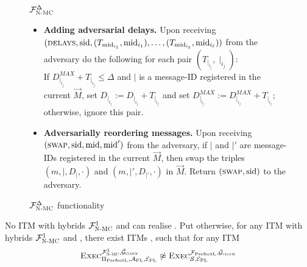 \begin{figure}
\begin{systembox}{$\mathcal{F}_{\textsc{N-MC}}^{\Delta}$}
{\begin{itemize}
\begin{enumerate}
			\end{enumerate}
			
			\smallskip
			\item \textbf{Adding adversarial delays.}
			Upon receiving $(\textsc{delays},\text{sid}, (T_{\text{mid}_{i_1}},\text{mid}_{i_1}), \ldots, (T_{\text{mid}_{i_\ell}},\text{mid}_{i_\ell}))$ from the adversary do the following for each pair $(T_{\mid_{i_j}},\mid_{i_j})$: \\
			If $D_{\mid_{i_j}}^{MAX}+T_{\mid_{i_j}}\leq\Delta$ and $\mid$ is a message-ID registered in the current $\vec{M}$, set $D_{\mid_{i_j}}:= D_{\mid_{i_j}} + T_{\mid_{i_j}}$ and set $D_{\mid_{i_j}}^{MAX}:= D_{\mid_{i_j}}^{MAX} + T_{\mid_{i_j}}$; otherwise, ignore this pair.   
			
			\smallskip
			\item \textbf{Adversarially reordering messages.}
			Upon receiving $(\textsc{swap},\text{sid}, \text{mid}, \text{mid}')$ from the adversary, if $\mid$ and $\mid'$ are message-IDs registered in the current $\vec{M}$, then swap the triples $(m,\mid,D_\mid,\cdot)$ and $(m,\mid', D_{\mid'},\cdot)$ in $\vec{M}$. Return $(\textsc{swap},\text{sid})$ to the adversary. 
		\end{itemize}
	}
\end{systembox}
\caption{$\mathcal{F}_{\textsc{N-MC}}^{\Delta}$ functionality}
\label{code:functionality:network}
\end{figure}

\begin{theorem}
  \label{theorem:perfectledger}
  No ITM \perfectprot{} with hybrids $\mathcal{F}_{\textsc{N-MC}}^1$ and \gFclock can realise
  \perfectledger. Put otherwise, for any ITM \perfectprot{} with hybrids
  $\mathcal{F}_{\textsc{N-MC}}^1$ and \gFclock, there exist ITMs \perfectenv, \perfectadv{}
  such that for any ITM \simulator
  \begin{equation*}
    \textsc{Exec}^{\mathcal{F}_{\textsc{N-MC}}^1, \bar{\mathcal{G}}_{\textsc{clock}}}_{\Pi_{\mathrm{PerfectL}},
    \mathcal{A}_{\mathrm{PL}}, \mathcal{E}_{\mathrm{PL}}} \not\approx
    \textsc{Exec}^{\mathcal{F}_{\mathrm{PerfectL}}, \bar{\mathcal{G}}_{\textsc{clock}}}_{\mathcal{S},
    \mathcal{E}_{\mathrm{PL}}}
  \end{equation*}
\end{theorem}

